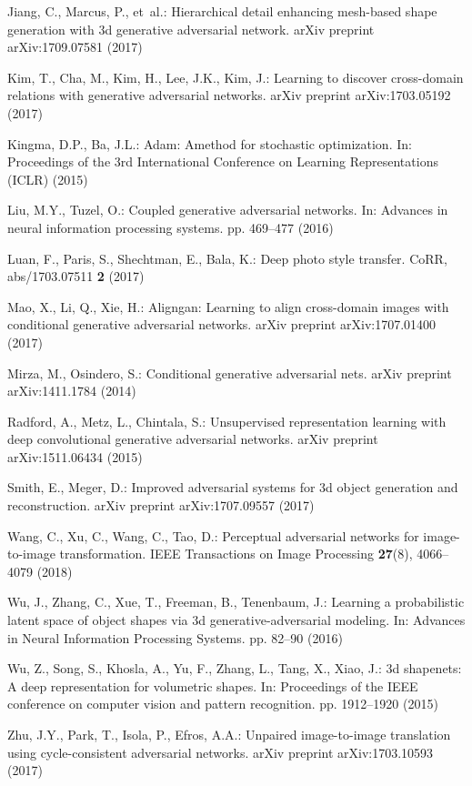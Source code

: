 \documentclass[runningheads]{llncs}
\begin{document}
\begin{thebibliography}{10}
Jiang, C., Marcus, P., et~al.: Hierarchical detail enhancing mesh-based shape
   generation with 3d generative adversarial network. arXiv preprint
   arXiv:1709.07581  (2017)

Kim, T., Cha, M., Kim, H., Lee, J.K., Kim, J.: Learning to discover
   cross-domain relations with generative adversarial networks. arXiv preprint
   arXiv:1703.05192  (2017)

Kingma, D.P., Ba, J.L.: Adam: Amethod for stochastic optimization. In:
   Proceedings of the 3rd International Conference on Learning Representations
   (ICLR) (2015)

Liu, M.Y., Tuzel, O.: Coupled generative adversarial networks. In: Advances in
   neural information processing systems. pp. 469--477 (2016)

Luan, F., Paris, S., Shechtman, E., Bala, K.: Deep photo style transfer. CoRR,
   abs/1703.07511  \textbf{2} (2017)

Mao, X., Li, Q., Xie, H.: Aligngan: Learning to align cross-domain images with
   conditional generative adversarial networks. arXiv preprint arXiv:1707.01400
   (2017)

Mirza, M., Osindero, S.: Conditional generative adversarial nets. arXiv
   preprint arXiv:1411.1784  (2014)

Radford, A., Metz, L., Chintala, S.: Unsupervised representation learning with
   deep convolutional generative adversarial networks. arXiv preprint
   arXiv:1511.06434  (2015)

Smith, E., Meger, D.: Improved adversarial systems for 3d object  
generation and
   reconstruction. arXiv preprint arXiv:1707.09557  (2017)

Wang, C., Xu, C., Wang, C., Tao, D.: Perceptual adversarial networks for
   image-to-image transformation. IEEE Transactions on Image Processing
   \textbf{27}(8),  4066--4079 (2018)

Wu, J., Zhang, C., Xue, T., Freeman, B., Tenenbaum, J.: Learning a
   probabilistic latent space of object shapes via 3d generative-adversarial
   modeling. In: Advances in Neural Information Processing Systems. pp. 82--90
   (2016)

Wu, Z., Song, S., Khosla, A., Yu, F., Zhang, L., Tang, X., Xiao, J.: 3d
   shapenets: A deep representation for volumetric shapes. In: Proceedings of
   the IEEE conference on computer vision and pattern recognition. pp.
   1912--1920 (2015)

Zhu, J.Y., Park, T., Isola, P., Efros, A.A.: Unpaired image-to-image
   translation using cycle-consistent adversarial networks. arXiv preprint arXiv:1703.10593
   (2017)

\end{thebibliography}
\end{document}
